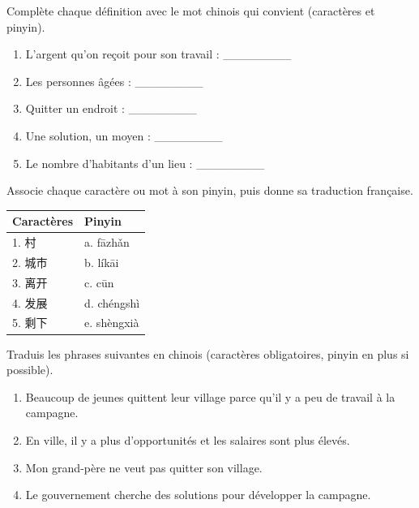 \documentclass[11pt]{article}
\newcounter{popsec}
\newcounter{popsub}
\newcommand{\courssub}[1]{%
  \stepcounter{popsub}%
  \par\vspace{9pt}\noindent{\popxbold\fontsize{11.5}{13}\selectfont\color{popink}{\color{poporange}\thepopsec.\thepopsub}\hspace{6pt}#1}\par\nopagebreak\vspace{4pt}
}
\begin{document}
\begin{exercice}
Complète chaque définition avec le mot chinois qui convient (caractères et pinyin).
\begin{enumerate}
\item L'argent qu'on reçoit pour son travail : \_\_\_\_\_\_\_\_
\item Les personnes âgées : \_\_\_\_\_\_\_\_
\item Quitter un endroit : \_\_\_\_\_\_\_\_
\item Une solution, un moyen : \_\_\_\_\_\_\_\_
\item Le nombre d'habitants d'un lieu : \_\_\_\_\_\_\_\_
\end{enumerate}
\end{exercice}

\begin{exercice}
Associe chaque caractère ou mot à son pinyin, puis donne sa traduction française.
\begin{center}
\begin{tabularx}{\linewidth}{|X|X|}\hline
\rowcolor{popblueL} Caractères & Pinyin \\ \hline
1. 村 & a. fāzhǎn \\ \hline
2. 城市 & b. líkāi \\ \hline
3. 离开 & c. cūn \\ \hline
4. 发展 & d. chéngshì \\ \hline
5. 剩下 & e. shèngxià \\ \hline
\end{tabularx}
\end{center}
\end{exercice}

\courssub{Je m'entraîne}

\begin{exercice}
Traduis les phrases suivantes en chinois (caractères obligatoires, pinyin en plus si possible).
\begin{enumerate}
\item Beaucoup de jeunes quittent leur village parce qu'il y a peu de travail à la campagne.
\item En ville, il y a plus d'opportunités et les salaires sont plus élevés.
\item Mon grand-père ne veut pas quitter son village.
\item Le gouvernement cherche des solutions pour développer la campagne.
\end{enumerate}
\end{exercice}
\end{document}

